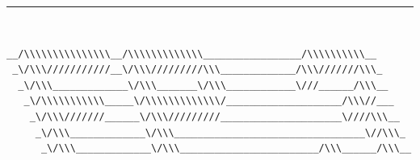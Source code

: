 \documentclass [a4paper,10pt]{article}
\begin{document}
\noindent\rule{\textwidth}{2pt}\\[-3mm]
    \linespread {0.7} {
    \begin{Verbatim}[fontsize=\small]
__/\\\\\\\\\\\\\\\__/\\\\\\\\\\\\\_________________/\\\\\\\\\\__        
 _\/\\\///////////__\/\\\/////////\\\_____________/\\\///////\\\_       
  _\/\\\_____________\/\\\_______\/\\\____________\///______/\\\__      
   _\/\\\\\\\\\\\_____\/\\\\\\\\\\\\\/____________________/\\\//___     
    _\/\\\///////______\/\\\/////////_____________________\////\\\__    
     _\/\\\_____________\/\\\_________________________________\//\\\_   
      _\/\\\_____________\/\\\________________________/\\\______/\\\__  

\end{Verbatim}}
\end{document}
